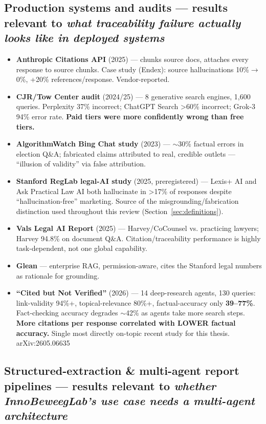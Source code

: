 \subsection{Production systems and audits — results relevant to \textit{what traceability failure actually looks like in deployed systems}}\label{sec:res-production}

\begin{itemize}
\item \textbf{Anthropic Citations API} (2025) — chunks source docs, attaches every response to source chunks. Case study (Endex): source hallucinations 10\%$\rightarrow$0\%, +20\% references/response. Vendor-reported.
\item \textbf{CJR/Tow Center audit} (2024/25) — 8 generative search engines, 1,600 queries. Perplexity 37\% incorrect; ChatGPT Search >60\% incorrect; Grok-3 94\% error rate. \textbf{Paid tiers were more confidently wrong than free tiers.}
\item \textbf{AlgorithmWatch Bing Chat study} (2023) — $\sim$30\% factual errors in election Q\&A; fabricated claims attributed to real, credible outlets — \textquotedblleft{}illusion of validity\textquotedblright{} via false attribution.
\item \textbf{Stanford RegLab legal-AI study} (2025, preregistered) — Lexis+ AI and Ask Practical Law AI both hallucinate in >17\% of responses despite \textquotedblleft{}hallucination-free\textquotedblright{} marketing. Source of the misgrounding/fabrication distinction used throughout this review (Section~\ref{sec:definitions}).
\item \textbf{Vals Legal AI Report} (2025) — Harvey/CoCounsel vs. practicing lawyers; Harvey 94.8\% on document Q\&A. Citation/traceability performance is highly task-dependent, not one global capability.
\item \textbf{Glean} — enterprise RAG, permission-aware, cites the Stanford legal numbers as rationale for grounding.
\item \textbf{\textquotedblleft{}Cited but Not Verified\textquotedblright{}} (2026) — 14 deep-research agents, 130 queries: link-validity 94\%+, topical-relevance 80\%+, factual-accuracy only \textbf{39–77\%}. Fact-checking accuracy degrades $\sim$42\% as agents take more search steps. \textbf{More citations per response correlated with LOWER factual accuracy.} Single most directly on-topic recent study for this thesis. arXiv:2605.06635
\end{itemize}

\subsection{Structured-extraction \& multi-agent report pipelines — results relevant to \textit{whether InnoBeweegLab's use case needs a multi-agent architecture}}\label{sec:res-pipelines}

